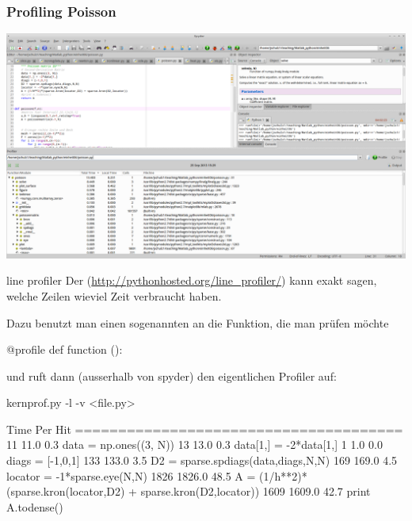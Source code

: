 \documentclass[hyperref={xetex}]{beamer}
\begin{document}
\begin{frame}[fragile]\frametitle{Profiling Poisson}
\begin{center}
\includegraphics[width=1\textwidth]{./figures/profile_poisson_py}
\end{center}
\end{frame}

\begin{frame}[fragile]{line profiler}
Der  (\url{http://pythonhosted.org/line_profiler/}) kann exakt sagen, welche
Zeilen wieviel Zeit verbraucht haben. 

Dazu benutzt man einen sogenannten  an die Funktion, die man prüfen möchte
\begin{pyin}
@profile
def function ():
\end{pyin}
und ruft dann (ausserhalb von spyder) den eigentlichen Profiler auf:
\begin{pyin}
kernprof.py -l -v <file.py>
\end{pyin}

\end{frame}

\begin{frame}[fragile]{}
  \begin{pyin}
 Time  Per Hit   %
======================================
   11     11.0      0.3      data = np.ones((3, N))
   13     13.0      0.3      data[1,] = -2*data[1,]
    1      1.0      0.0      diags = [-1,0,1] 
  133    133.0      3.5      D2 = sparse.spdiags(data,diags,N,N)
  169    169.0      4.5      locator = -1*sparse.eye(N,N)
 1826   1826.0     48.5      A = (1/h**2)*(sparse.kron(locator,D2) + sparse.kron(D2,locator))    
 1609   1609.0     42.7      print A.todense()
    
  \end{pyin}
\end{frame}
\end{document}
